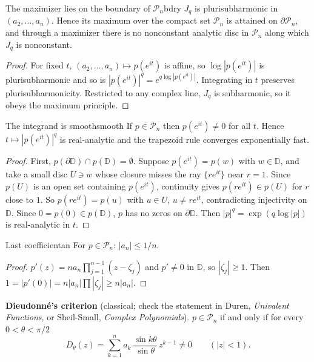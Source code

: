 \documentclass[11pt]{article}
\newcommand{\D}{\mathbb{D}}
\newcommand{\Pn}{\mathcal P_n}
\begin{document}
\begin{lemma}{The maximizer lies on the boundary of $\Pn$}{bdry}
$J_q$ is plurisubharmonic in $(a_2,\dots,a_n)$. Hence its maximum over the compact set $\Pn$ is attained on $\partial\Pn$, and through a maximizer there is no nonconstant analytic disc in $\Pn$ along which $J_q$ is nonconstant.
\end{lemma}
\begin{proof}
For fixed $t$, $(a_2,\dots,a_n)\mapsto p(e^{it})$ is affine, so $\log|p(e^{it})|$ is plurisubharmonic and so is $|p(e^{it})|^q=e^{q\log|p(e^{it})|}$. Integrating in $t$ preserves plurisubharmonicity. Restricted to any complex line, $J_q$ is subharmonic, so it obeys the maximum principle.
\end{proof}

\begin{lemma}{The integrand is smooth}{smooth}
If $p\in\Pn$ then $p(e^{it})\neq0$ for all $t$. Hence $t\mapsto|p(e^{it})|^q$ is real-analytic and the trapezoid rule converges exponentially fast.
\end{lemma}
\begin{proof}
First, $p(\partial\D)\cap p(\D)=\emptyset$. Suppose $p(e^{it})=p(w)$ with $w\in\D$, and take a small disc $U\ni w$ whose closure misses the ray $\{re^{it}\}$ near $r=1$. Since $p(U)$ is an open set containing $p(e^{it})$, continuity gives $p(re^{it})\in p(U)$ for $r$ close to $1$. So $p(re^{it})=p(u)$ with $u\in U$, $u\neq re^{it}$, contradicting injectivity on $\D$. Since $0=p(0)\in p(\D)$, $p$ has no zeros on $\partial\D$. Then $|p|^q=\exp(q\log|p|)$ is real-analytic in $t$.
\end{proof}

\begin{lemma}{Last coefficient}{an}
For $p\in\Pn$: $|a_n|\le 1/n$.
\end{lemma}
\begin{proof}
$p'(z)=na_n\prod_{j=1}^{n-1}(z-\zeta_j)$ and $p'\neq0$ in $\D$, so $|\zeta_j|\ge1$. Then $1=|p'(0)|=n|a_n|\prod|\zeta_j|\ge n|a_n|$.
\end{proof}

\textbf{Dieudonné's criterion} (classical; check the statement in Duren, \emph{Univalent Functions}, or Sheil-Small, \emph{Complex Polynomials}). $p\in\Pn$ if and only if for every $0<\theta<\pi/2$
\[
D_\theta(z)=\sum_{k=1}^n a_k\,\frac{\sin k\theta}{\sin\theta}\,z^{k-1}\neq0\qquad(|z|<1).
\]
\end{document}

